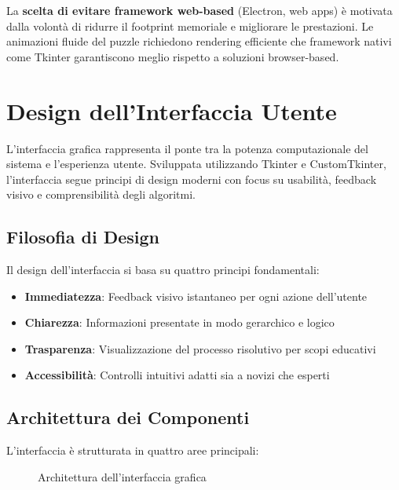 \documentclass[12pt,a4paper]{report}
\theoremstyle{definition}
\begin{document}
La \textbf{scelta di evitare framework web-based} (Electron, web apps) è motivata dalla volontà di ridurre il footprint memoriale e migliorare le prestazioni. Le animazioni fluide del puzzle richiedono rendering efficiente che framework nativi come Tkinter garantiscono meglio rispetto a soluzioni browser-based.

\section{Design dell'Interfaccia Utente}

L'interfaccia grafica rappresenta il ponte tra la potenza computazionale del sistema e l'esperienza utente. Sviluppata utilizzando Tkinter e CustomTkinter, l'interfaccia segue principi di design moderni con focus su usabilità, feedback visivo e comprensibilità degli algoritmi.

\subsection{Filosofia di Design}

Il design dell'interfaccia si basa su quattro principi fondamentali:

\begin{itemize}
    \item \textbf{Immediatezza}: Feedback visivo istantaneo per ogni azione dell'utente
    \item \textbf{Chiarezza}: Informazioni presentate in modo gerarchico e logico
    \item \textbf{Trasparenza}: Visualizzazione del processo risolutivo per scopi educativi
    \item \textbf{Accessibilità}: Controlli intuitivi adatti sia a novizi che esperti
\end{itemize}

\subsection{Architettura dei Componenti}

L'interfaccia è strutturata in quattro aree principali:

\begin{figure}[H]
\centering
{}
\caption{Architettura dell'interfaccia grafica}
\end{figure}
\end{document}
